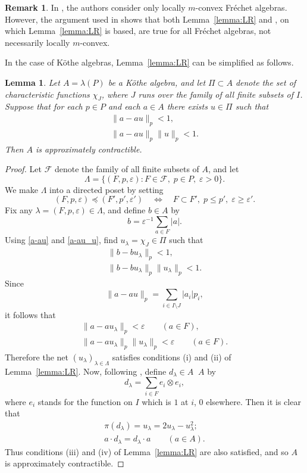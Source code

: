 \documentclass[12pt,reqno]{amsart}
\newtheorem{lemma}[theorem]{Lemma}
\theoremstyle{definition}
\newtheorem{remark}[theorem]{Remark}
\begin{document}
\begin{remark}
In \cite{LR}, the authors consider only locally $m$-convex Fr\'echet algebras.
However, the argument used in \cite{LR} shows that both Lemma~\ref{lemma:LR}
and \cite[Theorem 2.4]{LR}, on which Lemma~\ref{lemma:LR} is based,
are true for all Fr\'echet algebras, not necessarily locally $m$-convex.
\end{remark}

In the case of K\"othe algebras, Lemma~\ref{lemma:LR} can be simplified as follows.

\begin{lemma}
\label{lemma:a-au}
Let $A=\lambda(P)$ be a K\"othe algebra, and let
$\Pi\subset A$ denote the set of characteristic functions $\chi_J$,
where $J$ runs over the family of all finite subsets of $I$.
Suppose that for each $p\in P$ and each $a\in A$ there exists
$u\in\Pi$ such that
\begin{gather}
\label{a-au}
\| a-au\|_p<1,\\
\label{a-au_u}
\| a-au\|_p \| u\|_p < 1.
\end{gather}
Then $A$ is approximately contractible.
\end{lemma}
\begin{proof}
Let $\mathscr F$ denote the family of all finite subsets of $A$, and let
\[
\Lambda=\{ (F,p,{\varepsilon}) : F\in\mathscr F,\; p\in P,\; {\varepsilon}>0\}.
\]
We make $\Lambda$ into a directed poset by setting
\[
(F,p,{\varepsilon})\preceq (F',p',{\varepsilon}') \quad\iff\quad F\subset F',\; p\le p',\; {\varepsilon}\ge{\varepsilon}'.
\]
Fix any $\lambda=(F,p,{\varepsilon})\in\Lambda$, and define $b\in A$ by
\[
b={\varepsilon}^{-1}\sum_{a\in F} |a|.
\]
Using \eqref{a-au} and \eqref{a-au_u}, find $u_\lambda=\chi_J\in\Pi$ such that
\begin{gather*}
\| b-bu_\lambda\|_p<1,\\
\| b-bu_\lambda\|_p \| u_\lambda\|_p < 1.
\end{gather*}
Since
\begin{equation*}
\| a-au\|_p=\sum_{i\in I\setminus J} |a_i| p_i,
\end{equation*}
it follows that
\begin{gather*}
\| a-au_\lambda\|_p<{\varepsilon} \qquad (a\in F),\\
\| a-au_\lambda\|_p \| u_\lambda\|_p < {\varepsilon} \qquad (a\in F).
\end{gather*}
Therefore the net $(u_\lambda)_{\lambda\in\Lambda}$ satisfies
conditions (i) and (ii) of Lemma~\ref{lemma:LR}.
Now, following \cite[Example 3.1]{LR}, define $d_\lambda\in A{\mathop{\widehat\otimes}} A$ by
\[
d_\lambda=\sum_{i\in F} e_i\otimes e_i,
\]
where $e_i$ stands for the function on $I$ which is $1$ at $i$, $0$ elsewhere.
Then it is clear that
\begin{gather*}
\pi(d_\lambda)=u_\lambda=2u_\lambda-u_\lambda^2;\\
a\cdot d_\lambda=d_\lambda\cdot a \qquad (a\in A).
\end{gather*}
Thus conditions (iii) and (iv) of Lemma~\ref{lemma:LR} are also satisfied,
and so $A$ is approximately contractible.
\end{proof}
\end{document}
